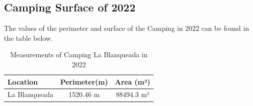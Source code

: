 \subsection{Camping Surface of 2022}
The values of the perimeter and surface of the Camping in 2022 can be found in the table below. 

\begin{table}[h]
\centering
\caption{Measurements of Camping La Blanqueada in 2022}
\label{tab:Measurements of Camping La Blanqueada in 2022}
\begin{tabular}{l S[table-format=5.2] S[table-format=5.2]}
\toprule
\textbf{Location} & \textbf{Perimeter(m)} & \textbf{ Area (m²)} \\
\midrule
La Blanqueada & 1520.46 m & 88494.3 m²\\
\bottomrule
\end{tabular}
\end{table}

